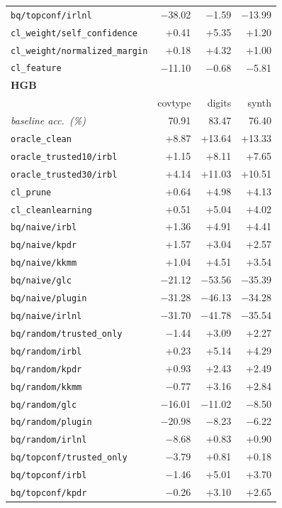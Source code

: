 \begin{tabular}{lrrr}
\texttt{bq/topconf/irlnl} & $-$38.02 & $-$1.59 & $-$13.99 \\
\texttt{cl\_weight/self\_confidence} & +0.41 & +5.35 & +1.20 \\
\texttt{cl\_weight/normalized\_margin} & +0.18 & +4.32 & +1.00 \\
\texttt{cl\_feature} & $-$11.10 & $-$0.68 & $-$5.81 \\
\midrule
\multicolumn{4}{l}{\textbf{HGB}} \\
 & covtype & digits & synth \\
\midrule
\textit{baseline acc.\ (\%)} & 70.91 & 83.47 & 76.40 \\
\addlinespace
\texttt{oracle\_clean} & +8.87 & +13.64 & +13.33 \\
\texttt{oracle\_trusted10/irbl} & +1.15 & +8.11 & +7.65 \\
\texttt{oracle\_trusted30/irbl} & +4.14 & +11.03 & +10.51 \\
\texttt{cl\_prune} & +0.64 & +4.98 & +4.13 \\
\texttt{cl\_cleanlearning} & +0.51 & +5.04 & +4.02 \\
\texttt{bq/naive/irbl} & +1.36 & +4.91 & +4.41 \\
\texttt{bq/naive/kpdr} & +1.57 & +3.04 & +2.57 \\
\texttt{bq/naive/kkmm} & +1.04 & +4.51 & +3.54 \\
\texttt{bq/naive/glc} & $-$21.12 & $-$53.56 & $-$35.39 \\
\texttt{bq/naive/plugin} & $-$31.28 & $-$46.13 & $-$34.28 \\
\texttt{bq/naive/irlnl} & $-$31.70 & $-$41.78 & $-$35.54 \\
\texttt{bq/random/trusted\_only} & $-$1.44 & +3.09 & +2.27 \\
\texttt{bq/random/irbl} & +0.23 & +5.14 & +4.29 \\
\texttt{bq/random/kpdr} & +0.93 & +2.43 & +2.49 \\
\texttt{bq/random/kkmm} & $-$0.77 & +3.16 & +2.84 \\
\texttt{bq/random/glc} & $-$16.01 & $-$11.02 & $-$8.50 \\
\texttt{bq/random/plugin} & $-$20.98 & $-$8.23 & $-$6.22 \\
\texttt{bq/random/irlnl} & $-$8.68 & +0.83 & +0.90 \\
\texttt{bq/topconf/trusted\_only} & $-$3.79 & +0.81 & +0.18 \\
\texttt{bq/topconf/irbl} & $-$1.46 & +5.01 & +3.70 \\
\texttt{bq/topconf/kpdr} & $-$0.26 & +3.10 & +2.65 \\

\end{tabular}
